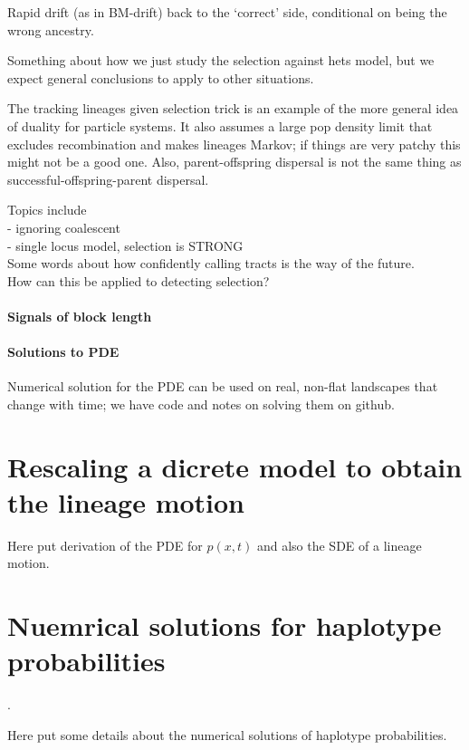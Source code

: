 \documentclass[12pt]{article}
\begin{document}
Rapid drift (as in BM-drift) back to the `correct' side, conditional on being the wrong ancestry.

Something about how we just study the selection against hets model,
but we expect general conclusions to apply to other situations.

The tracking lineages given selection trick is an example of the more general idea of duality for particle systems.
It also assumes a large pop density limit that excludes recombination and makes lineages Markov;
if things are very patchy this might not be a good one.
Also, parent-offspring dispersal is not the same thing as successful-offspring-parent dispersal.


Topics include\\
- ignoring coalescent\\
- single locus model, selection is STRONG\\

Some words about how confidently calling tracts is the way of the future.\\
How can this be applied to detecting selection?

\paragraph{Signals of block length}

\paragraph{Solutions to PDE}
Numerical solution for the PDE can be used on real, non-flat landscapes that change with time;
we have code and notes on solving them on github.




\appendix

\section{Rescaling a dicrete model to obtain the lineage motion}
\label{apx:lineage_derivation}

Here put derivation of the PDE for $p(x,t)$ and also the SDE of a lineage motion.

\section{Nuemrical solutions for haplotype probabilities}
\label{apx:haplotype_calcs}.

Here put some details about the numerical solutions of haplotype probabilities.
\end{document}
